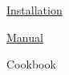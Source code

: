 
\begin{DoxyItemize}
\item \mbox{\hyperlink{installpage}{Installation}}
\item \mbox{\hyperlink{manualpage}{Manual}}
\item Cookbook 
\end{DoxyItemize}